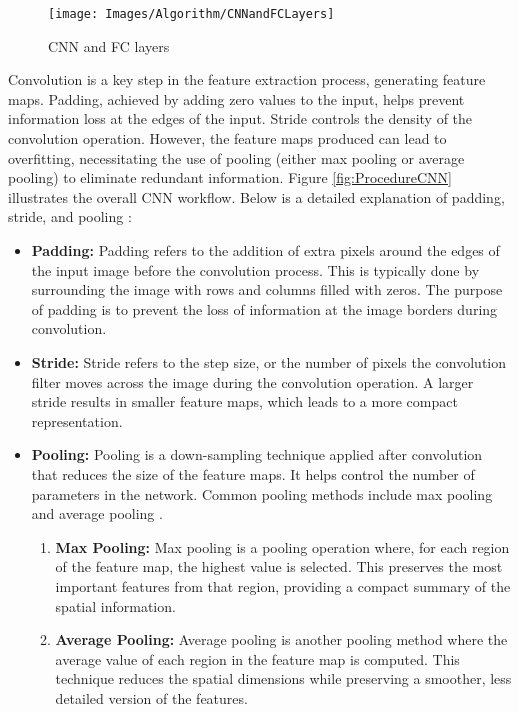 \begin{figure}[h!]
	\centering
	\texttt{[image: Images/Algorithm/CNNandFCLayers]}
	\caption{CNN and FC layers \cite{Wings:2023}} \label{fig:CNNandFCLayers}
\end{figure}


Convolution is a key step in the feature extraction process, generating feature maps. Padding, achieved by adding zero values to the input, helps prevent information loss at the edges of the input. Stride controls the density of the convolution operation. However, the feature maps produced can lead to overfitting, necessitating the use of pooling (either max pooling or average pooling) to eliminate redundant information. Figure \ref{fig:ProcedureCNN} illustrates the overall CNN workflow. Below is a detailed explanation of padding, stride, and pooling \cite{Li:2021}:

\begin{itemize}
	\item \textbf{Padding:} Padding refers to the addition of extra pixels around the edges of the input image before the convolution process. This is typically done by surrounding the image with rows and columns filled with zeros. The purpose of padding is to prevent the loss of information at the image borders during convolution.
	
	\item \textbf{Stride:} Stride refers to the step size, or the number of pixels the convolution filter moves across the image during the convolution operation. A larger stride results in smaller feature maps, which leads to a more compact representation.
	
	\item \textbf{Pooling:} Pooling is a down-sampling technique applied after convolution that reduces the size of the feature maps. It helps control the number of parameters in the network. Common pooling methods include max pooling and average pooling \cite{Wings:2023}.
	
	\begin{enumerate}
		\item \textbf{Max Pooling:} Max pooling is a pooling operation where, for each region of the feature map, the highest value is selected. This preserves the most important features from that region, providing a compact summary of the spatial information.
		
		\item \textbf{Average Pooling:} Average pooling is another pooling method where the average value of each region in the feature map is computed. This technique reduces the spatial dimensions while preserving a smoother, less detailed version of the features.
	\end{enumerate}
\end{itemize}

